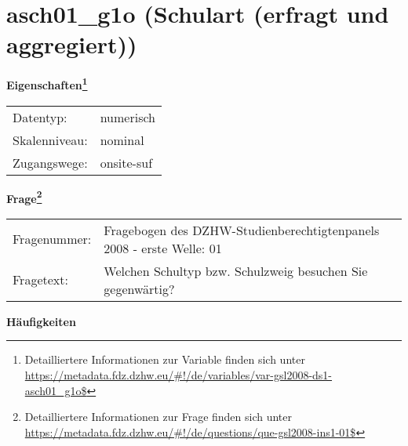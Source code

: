 
    \setcounter{footnote}{0}

    \vspace*{-1.8cm}
	\section{asch01\_g1o (Schulart (erfragt und aggregiert))}
	\label{section:asch01_g1o}



    \vspace*{0.5cm}
    \noindent\textbf{Eigenschaften\footnote{Detailliertere Informationen zur Variable finden sich unter
		\url{https://metadata.fdz.dzhw.eu/\#!/de/variables/var-gsl2008-ds1-asch01_g1o$}}}\\
	\begin{tabularx}{\hsize}{@{}lX}
	Datentyp: & numerisch \\
	Skalenniveau: & nominal \\
	Zugangswege: &
	  onsite-suf
 \\
    \end{tabularx}



				\vspace*{0.5cm}
                \noindent\textbf{Frage\footnote{Detailliertere Informationen zur Frage finden sich unter
		              \url{https://metadata.fdz.dzhw.eu/\#!/de/questions/que-gsl2008-ins1-01$}}}\\
				\begin{tabularx}{\hsize}{@{}lX}
					Fragenummer: &
					  Fragebogen des DZHW-Studienberechtigtenpanels 2008 - erste Welle:
					  01
 \\
					Fragetext: & Welchen Schultyp bzw. Schulzweig besuchen Sie gegenwärtig? \\
				\end{tabularx}





        		\vspace*{0.5cm}
                \noindent\textbf{Häufigkeiten}


